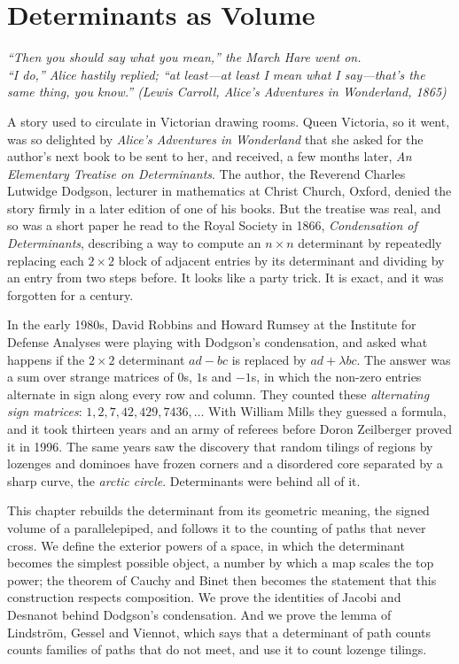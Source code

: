 \chapter{Determinants as Volume}\label{ch:volume}

\begin{center}\itshape
``Then you should say what you mean,'' the March Hare went on.\\
``I do,'' Alice hastily replied; ``at least---at least I mean what I say---that's the same thing, you know.''
\upshape(Lewis Carroll, \emph{Alice's Adventures in Wonderland}, 1865)
\end{center}

A story used to circulate in Victorian drawing rooms. Queen Victoria, so it went, was so delighted by \emph{Alice's
Adventures in Wonderland} that she asked for the author's next book to be sent to her, and received, a few months later,
\emph{An Elementary Treatise on Determinants}. The author, the Reverend Charles Lutwidge Dodgson, lecturer in mathematics
at Christ Church, Oxford, denied the story firmly in a later edition of one of his books. But the treatise was real,
and so was a short paper he read to the Royal Society in 1866, \emph{Condensation of Determinants}, describing a way to
compute an $n\times n$ determinant by repeatedly replacing each $2\times2$ block of adjacent entries by its determinant
and dividing by an entry from two steps before. It looks like a party trick. It is exact, and it was forgotten for a
century.

In the early 1980s, David Robbins and Howard Rumsey at the Institute for Defense Analyses were playing with Dodgson's
condensation, and asked what happens if the $2\times2$ determinant $ad-bc$ is replaced by $ad+\lambda bc$. The answer
was a sum over strange matrices of $0$s, $1$s and $-1$s, in which the non-zero entries alternate in sign along every row
and column. They counted these \emph{alternating sign matrices}: $1,2,7,42,429,7436,\dots$ With William Mills they
guessed a formula, and it took thirteen years and an army of referees before Doron Zeilberger proved it in 1996. The
same years saw the discovery that random tilings of regions by lozenges and dominoes have frozen corners and a
disordered core separated by a sharp curve, the \emph{arctic circle}. Determinants were behind all of it.

This chapter rebuilds the determinant from its geometric meaning, the signed volume of a parallelepiped, and follows it
to the counting of paths that never cross. We define the exterior powers of a space, in which the determinant becomes
the simplest possible object, a number by which a map scales the top power; the theorem of Cauchy and Binet then becomes
the statement that this construction respects composition. We prove the identities of Jacobi and Desnanot behind
Dodgson's condensation. And we prove the lemma of Lindstr\"om, Gessel and Viennot, which says that a determinant of path
counts counts families of paths that do not meet, and use it to count lozenge tilings.

